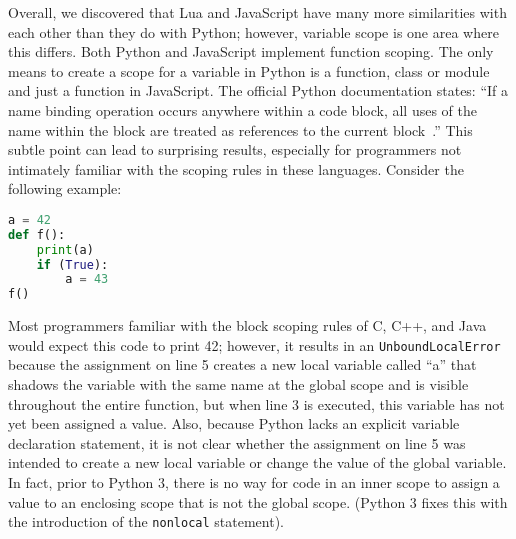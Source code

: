 


Overall, we discovered that Lua and JavaScript have many more similarities with
each other than they do with Python; however, variable scope is one area
where this differs. Both Python and JavaScript implement function scoping. The only
means to create a scope for a variable in Python is a function, class or module and
just a function in JavaScript. The official Python documentation states: 
``If a name binding operation occurs anywhere within a code block, all uses of the 
name within the block are treated as references to the current block~\cite{pyscope}.'' 
This subtle point can lead to surprising results, especially for programmers not
intimately familiar with the scoping rules in these languages. Consider the
following example:

\begin{lstlisting}[language=Python,caption=A demonstration of function scope in Python.]
a = 42
def f():
	print(a)
	if (True):
		a = 43
f()
\end{lstlisting}

Most programmers familiar with the block scoping rules of C, C++, and Java would expect
this code to print 42; however, it results in an \texttt{UnboundLocalError} because
the assignment on line 5 creates a new local variable called ``a'' that shadows the
variable with the same name at the global scope and is visible throughout the
entire function, but when line 3 is executed, this variable has not yet been assigned
a value. Also, because Python lacks an explicit variable declaration statement,
it is not clear whether the assignment on line 5 was intended to create a new
local variable or change the value of the global variable. In fact, prior to Python 3,
there is no way for code in an inner scope to assign a value to an enclosing scope
that is not the global scope. (Python 3 fixes this with the introduction of the 
\texttt{nonlocal} statement).

